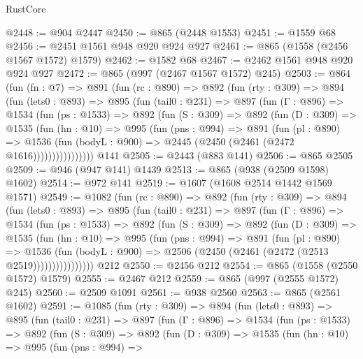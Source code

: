\begin{lexlean}{RustCore}
\begin{coremodule}
{\begin{coremodule}
{{{{{{{{@2448 := @904 @2447
@2450 := @865 (@2448 @1553)
@2451 := @1559 @68
@2456 := @2451 @1561 @948 @920 @924 @927
@2461 := @865 (@1558 (@2456 @1567 @1572) @1579)
@2462 := @1582 @68
@2467 := @2462 @1561 @948 @920 @924 @927
@2472 := @865 (@997 (@2467 @1567 @1572) @245)
@2503 := @864
    (fun (fn : @7) =>
    @891
      (fun (rc : @890) =>
      @892
        (fun (rty : @309) =>
        @894
          (fun (lets0 : @893) =>
          @895
            (fun (tail0 : @231) =>
            @897
              (fun (Γ : @896) =>
              @1534
                (fun (ps : @1533) =>
                @892
                  (fun (S : @309) =>
                  @892
                    (fun (D : @309) =>
                    @1535
                      (fun (hn : @10) =>
                      @995
                        (fun (pns : @994) =>
                        @891
                          (fun (pl : @890) =>
                          @1536
                            (fun (bodyL : @900) => @2445 (@2450 (@2461 (@2472 @1616))))))))))))))))
    @141
@2505 := @2443 (@883 @141)
@2506 := @865 @2505
@2509 := @946 (@947 @141) @1439
@2513 := @865 (@938 (@2509 @1598) @1602)
@2514 := @972 @141
@2519 := @1607 (@1608 @2514 @1442 @1569 @1571)
@2549 := @1082
    (fun (rc : @890) =>
    @892
      (fun (rty : @309) =>
      @894
        (fun (lets0 : @893) =>
        @895
          (fun (tail0 : @231) =>
          @897
            (fun (Γ : @896) =>
            @1534
              (fun (ps : @1533) =>
              @892
                (fun (S : @309) =>
                @892
                  (fun (D : @309) =>
                  @1535
                    (fun (hn : @10) =>
                    @995
                      (fun (pns : @994) =>
                      @891
                        (fun (pl : @890) =>
                        @1536
                          (fun (bodyL : @900) =>
                          @2506 (@2450 (@2461 (@2472 (@2513 @2519))))))))))))))))
    @212
@2550 := @2456 @212
@2554 := @865 (@1558 (@2550 @1572) @1579)
@2555 := @2467 @212
@2559 := @865 (@997 (@2555 @1572) @245)
@2560 := @2509 @1091
@2561 := @938 @2560
@2563 := @865 (@2561 @1602)
@2591 := @1085
    (fun (rty : @309) =>
    @894
      (fun (lets0 : @893) =>
      @895
        (fun (tail0 : @231) =>
        @897
          (fun (Γ : @896) =>
          @1534
            (fun (ps : @1533) =>
            @892
              (fun (S : @309) =>
              @892
                (fun (D : @309) =>
                @1535
                  (fun (hn : @10) =>
                  @995
                    (fun (pns : @994) =>
}}}}}}}}
\end{coremodule}}
\end{coremodule}
\end{lexlean}
